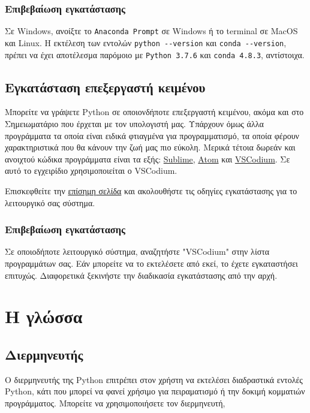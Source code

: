 \documentclass[14pt]{extreport}
\begin{document}
\subsubsection{Επιβεβαίωση εγκατάστασης}
Σε Windows, ανοίξτε το \lstinline{Anaconda Prompt} σε Windows ή το terminal σε MacOS και Linux. Η εκτέλεση των εντολών \lstinline{python --version} και \lstinline{conda --version}, πρέπει να έχει αποτέλεσμα παρόμοιο με \lstinline{Python 3.7.6} και \lstinline{conda 4.8.3}, αντίστοιχα.

\subsection{Εγκατάσταση επεξεργαστή κειμένου}
Μπορείτε να γράψετε Python σε οποιονδήποτε επεξεργαστή κειμένου, ακόμα και στο Σημειωματάριο που έρχεται με τον υπολογιστή μας. Υπάρχουν όμως άλλα προγράμματα τα οποία είναι ειδικά φτιαγμένα για προγραμματισμό, τα οποία φέρουν χαρακτηριστικά που θα κάνουν την ζωή μας πιο εύκολη. Μερικά τέτοια δωρεάν και ανοιχτού κώδικα προγράμματα είναι τα εξής: \href{https://www.sublimetext.com/}{Sublime}, \href{https://atom.io/}{Atom} και \href{https://vscodium.com/}{VSCodium}. Σε αυτό το εγχειρίδιο χρησιμοποιείται ο VSCodium.

Επισκεφθείτε την \href{https://vscodium.com/#install}{επίσημη σελίδα} και ακολουθήστε τις οδηγίες εγκατάστασης για το λειτουργικό σας σύστημα.

\subsubsection{Επιβεβαίωση εγκατάστασης}
Σε οποιοδήποτε λειτουργικό σύστημα, αναζητήστε "VSCodium" στην λίστα προγραμμάτων σας. Εάν μπορείτε να το εκτελέσετε από εκεί, το έχετε εγκαταστήσει επιτυχώς. Διαφορετικά ξεκινήστε την διαδικασία εγκατάστασης από την αρχή.

\section{Η γλώσσα}
\subsection{Διερμηνευτής}

Ο διερμηνευτής της Python επιτρέπει στον χρήστη να εκτελέσει διαδραστικά εντολές Python, κάτι που μπορεί να φανεί χρήσιμο για πειραματισμό ή την δοκιμή κομματιών προγράμματος. Μπορείτε να χρησιμοποιήσετε τον διερμηνευτή,
\end{document}
